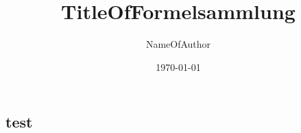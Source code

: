 

\newcommand{\FormelsammlungTitel}{TitleOfFormelsammlung}
\newcommand{\FormelsammlungAutor}{NameOfAuthor}
\setcounter{tocdepth}{2} %


	\title{\FormelsammlungTitel}
	\author{\FormelsammlungAutor}
	\date{\today}
	\begin{multicols}{3}
        {\small%
			\maketitle
			\tableofcontents
		\section{test}
        }
	\end{multicols}

